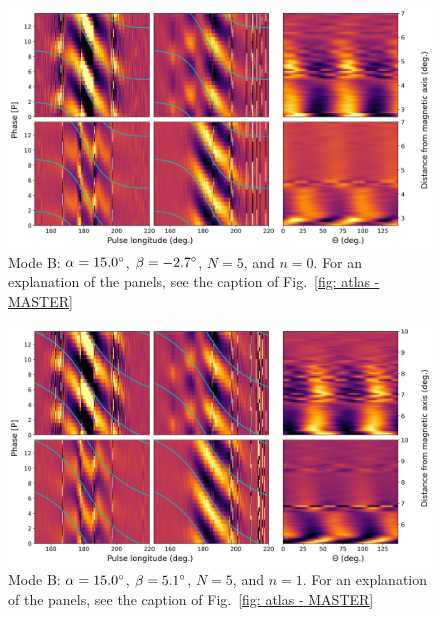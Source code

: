 \begin{figure}
	\begin{center}
		\includegraphics[width=\atlasHeightFrac\textwidth]{Figures/B0031/atlas/B_517015005000_plots}
		\caption[Atlas results: Mode B -- $\alpha=15.0\degr$, $\beta=-2.7\degr$, $N=5$, $n=0$]{Mode B: $\alpha=15.0\degr$, $\beta=-2.7\degr$, $N=5$, and $n=0$. For an explanation of the panels, see the caption of Fig.~\ref{fig: atlas - MASTER} }
		\label{fig: atlas - B_517015005000}
	\end{center}
\end{figure}

\begin{figure}
	\begin{center}
		\includegraphics[width=\atlasHeightFrac\textwidth]{Figures/B0031/atlas/B_517015005001_plots}
		\caption[Atlas results: Mode B -- $\alpha=15.0\degr$, $\beta=5.1\degr$, $N=5$, $n=1$]{Mode B: $\alpha=15.0\degr$, $\beta=5.1\degr$, $N=5$, and $n=1$. For an explanation of the panels, see the caption of Fig.~\ref{fig: atlas - MASTER} }
		\label{fig: atlas - B_517015005001}
	\end{center}
\end{figure}

